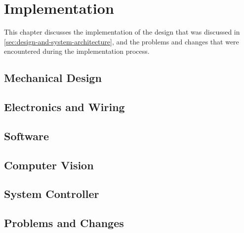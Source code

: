 \section{Implementation}
\label{sec:implementation}

This chapter discusses the implementation of the design that was discussed in \autoref{sec:design-and-system-architecture}, and the problems and changes that were encountered during the implementation process.

\subsection{Mechanical Design}
\label{sec:implementation-mechanical-design}


\subsection{Electronics and Wiring}
\label{sec:electronics}


\subsection{Software}
\label{sec:software}


\subsection{Computer Vision}
\label{sec:computer-vision}
  

\subsection{System Controller}
\label{sec:system-controller-implementation}


\subsection{Problems and Changes}
\label{sec:implementation-problems-and-changes}